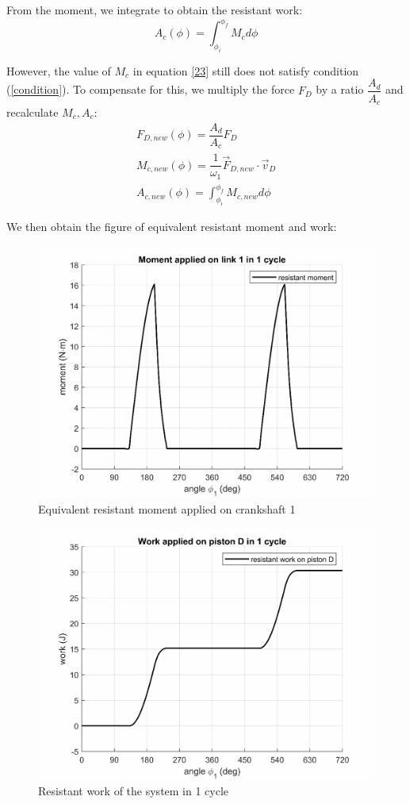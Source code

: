 From the moment, we integrate to obtain the resistant work:
\begin{equation}\label{24}
A_c(\phi)=\int_{\phi_i}^{\phi_f}M_c d\phi
\end{equation}

However, the value of $ M_c $ in equation \ref{23} still does not satisfy condition (\ref{condition}). To compensate for this, we multiply the force $ F_D $ by a ratio $ \dfrac{A_d}{A_c} $ and recalculate $ M_c, A_c $:
\begin{equation}
\begin{array}{l}
F_{D,new}(\phi)=\dfrac{A_d}{A_c}F_D\\
M_{c,new}(\phi)=\dfrac{1}{\omega_1}\vec{F}_{D,new}\cdot\vec{v}_D\\
\displaystyle A_{c,new}(\phi)=\int_{\phi_i}^{\phi_f}M_{c,new} d\phi
\end{array}
\end{equation}

We then obtain the figure of equivalent resistant moment and work:
\begin{figure}[h]
	\centering
	\includegraphics[width=0.6\linewidth]{16}
	\caption{Equivalent resistant moment applied on crankshaft 1}
	\label{fig:16}
\end{figure}
\begin{figure}[h]
	\centering
	\includegraphics[width=0.66\linewidth]{17}
	\caption{Resistant work of the system in 1 cycle}
	\label{fig:17}
\end{figure}


